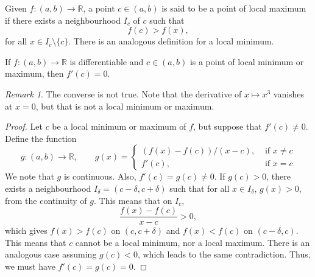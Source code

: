 \documentclass[11pt]{article}
\def\R{\mathbb{R}}
\theoremstyle{definition}
\theoremstyle{remark}
\newtheorem*{remark}{Remark}
\numberwithin{equation}{module}
\begin{document}
    \begin{definition}
        Given $f \colon (a, b) \to \R$, a point $c \in (a, b)$ is said to be a point
        of local maximum if there exists a neighbourhood $I_c$ of $c$ such that \[
            f(c) > f(x),
        \] for all $x \in I_c\setminus\{c\}$.
        There is an analogous definition for a local minimum.
    \end{definition}
    \begin{theorem}
        If $f\colon (a, b) \to \R$ is differentiable and $c \in (a, b)$ is a point
        of local minimum or maximum, then $f'(c) = 0$.
        \begin{remark}
            The converse is not true. Note that the derivative of $x \mapsto x^3$
            vanishes at $x = 0$, but that is not a local minimum or maximum.
        \end{remark}
    \end{theorem}
    \begin{proof}
        Let $c$ be a local minimum or maximum of $f$, but suppose that $f'(c) \neq 0$.
        Define the function \[
            g\colon (a, b) \to \R, \qquad g(x) = \begin{cases}
                (f(x) - f(c))/(x - c), &\text{ if } x \neq c \\                
                f'(c), &\text{ if } x = c
            \end{cases}
        \] We note that $g$ is continuous. Also, $f'(c) = g(c) \neq 0$.
        If $g(c) > 0$, there exists a neighbourhood $I_\delta = (c - \delta, c +
        \delta)$ such that for all $x \in I_\delta$, $g(x) > 0$, from the continuity
        of $g$. This means that on $I_c$, \[
            \frac{f(x) - f(c)}{x - c} > 0,
        \] which gives $f(x) > f(c)$ on $(c, c + \delta)$ and $f(x) < f(c)$ on $(c -
        \delta, c)$. This means that $c$ cannot be a local minimum, nor a local
        maximum. There is an analogous case assuming $g(c) < 0$, which leads to the
        same contradiction. Thus, we must have $f'(c) = g(c) = 0$.
    \end{proof}
\end{document}
